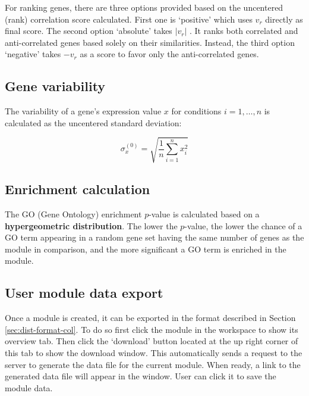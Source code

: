 For ranking genes, there are three options provided based on the
uncentered (rank) correlation score calculated. First one is
‘positive’ which uses $v_r$ directly as final score.  The second
option ‘absolute’ takes $|v_r|$ . It ranks both correlated and
anti-correlated genes based solely on their similarities. Instead, 
the third option ‘negative’ takes $-v_r$ as a score to favor only 
the anti-correlated genes.



\subsection{Gene variability}\label{apd:gene-sd}

The variability of a gene's expression value $x$ for conditions $i=1,…,n$ is calculated as the uncentered standard deviation: 

\begin{equation}
\sigma_x^{(0)}=\sqrt{\frac{1}{n}\sum\limits_{i=1}^{n}x_i^2}
\end{equation}


\subsection{Enrichment calculation}\label{apd:enrichment}

The GO (Gene Ontology) enrichment $p$-value is calculated based on a 
\textbf{hypergeometric distribution}. The lower the $p$-value, the lower the 
chance of a GO term appearing in a random gene set having the same number of 
genes as the module in comparison, and the more significant a GO term is 
enriched in the module.

\subsection{User module data export}\label{apd:data-download}

Once a module is created, it can be exported in the format described 
in Section \ref{sec:dist-format-col}. 
To do so first click the module in the workspace to show its 
overview tab. 
Then click the `download' button located at the up right corner of 
this tab to show the download window. 
This automatically sends a request to the server to generate the data file for 
the current module. 
When ready, a link to the generated data file will appear in the window. 
User can click it to save the module data.


